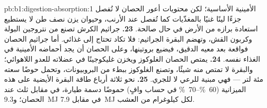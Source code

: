 \begin{solution}{pb:b1:digestion-absorption:1}
الأمينية الأساسية؛ لكن محتويات أعور الحصان لا تُفصل جزءًا لينًا
غنيًا بالمغذّيات كما تُفصل عند الأرنب، وحيوان يزن نصف طن لا يستطيع
استعادة برازه من الأرض في حال صالحة.
\textbf{23.} جراثيم الكرش تصنع  من نتروجين البولة وكربون
القش، وتهضم البقرة الجراثيم: فلا تكاد تحتاج إلى  غذائي. أما
جراثيم الحصان فواقعة بعد معيه الدقيق، فيضيع بروتينها، وعلى الحصان
أن يجد أحماضه الأمينية في الغذاء نفسه.
\textbf{24.} يمتص الحصان الغلوكوز ويخزن غليكوجينًا في عضلاته
للعدو اللاهوائي؛ والبقرة لا تمتص منه شيئًا، وتصنع الغلوكوز ببطء من
البروبيونات، وتحمل حوضًا سعته مئة لتر --- فهي مبنية للرعي لا
للجري.
\textbf{25.} نحو ثلاثة أرباع طاقة البقرة الأيضية على هذه الميزانية
(\qtyrange{60}{70}{\%} في حساب وافٍ) حموضًا دسمة طيارة، في مقابل
ثلث عند الحصان؛ و\qty{9.3}{MJ} في مقابل \qty{7.9}{MJ} لكل كيلوغرام
من العشب.
\end{solution}
